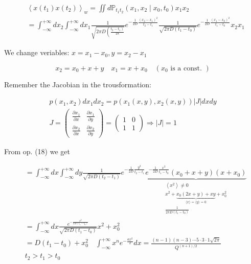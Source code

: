 \documentclass[10pt]{article}
\begin{document}
\begin{align*}
& \left\langle x\left(t_{1}\right) x\left(t_{2}\right)\right\rangle_{w}=\iint d \mathbb{P}_{t_{1} t_{2}}\left(x_{1}, x_{2} \mid x_{0}, t_{0}\right) x_{1} x_{2}  \tag{18}\\
& =\int_{-\infty}^{+\infty} d x_{2} \int_{-\infty}^{+\infty} d x_{1} \frac{1}{\sqrt{2 \pi D\left(\frac{\left.t_{2}-t_{1}\right)}{18}\right.}} e^{-\frac{1}{2 D} \frac{\left(x_{2}-x_{1}\right)^{2}}{t_{2}-t_{1}}} \frac{1}{\sqrt{2 \pi D\left(t_{1}-t_{0}\right)}} e^{-\frac{1}{2 D} \frac{\left(x_{1}-x_{0}\right)^{2}}{t_{1}-t_{0}}} x_{2} x_{1}
\end{align*}


We change veriables: $x=x_{1}-x_{0}, y=x_{2}-x_{1}$

$$
x_{2}=x_{0}+x+y \quad x_{1}=x+x_{0} \quad\left(x_{0} \text { is a const. }\right)
$$

Remember the Jacobian in the trousformation:

$$
\begin{array}{r}
p\left(x_{1}, x_{2}\right) d x_{1} d x_{2}=p\left(x_{1}(x, y), x_{2}(x, y)\right)|J| d x d y \\
J=\left(\begin{array}{cc}
\frac{\partial x_{1}}{\partial x} & \frac{\partial x_{1}}{\partial y} \\
\frac{\partial x_{2}}{\partial x} & \frac{\partial x_{2}}{\partial y}
\end{array}\right)=\left(\begin{array}{cc}
1 & 0 \\
1 & 1
\end{array}\right) \Rightarrow|J|=1
\end{array}
$$

From op. (18) we get

$$
\begin{aligned}
& =\int_{-\infty}^{+\infty} d x \int_{-\infty}^{+\infty} d y \frac{1}{\sqrt{2 \pi D\left(t_{2}-t_{1}\right)}} e^{-\frac{1}{2 D} \frac{y^{2}}{t_{2}-t_{1}}} \underbrace{e^{-\frac{1}{2 D} \frac{x^{2}}{t_{1}-t_{0}}}\left(x_{0}+x+y\right)\left(x+x_{0}\right)}_{\begin{array}{c}
\left\langle x^{2}\right\rangle \neq 0 \\
x^{2}+\underbrace{x_{0}(2 x+y)+x y}_{\langle x\rangle=\langle y\rangle=0}+x_{0}^{2} \\
\frac{1}{2 \pi D\left(t_{1}-t_{0}\right)}
\end{array}} \\
& =\int_{-\infty}^{+\infty} d x \frac{e^{-\frac{x^{2}}{2 \Delta\left(t_{1}-t_{0}\right)}}}{\sqrt{2 \pi D\left(t_{1}-t_{0}\right)}} x^{2}+x_{0}^{2} \\
& =D\left(t_{1}-t_{0}\right)+x_{0}^{2} \quad \int_{-\infty}^{+\infty} x^{n} e^{-\frac{a x^{2}}{2}} d x=\frac{(n-1)(n-3) \cdots 5 \cdot 3 \cdot 1 \sqrt{2 \pi}}{Q^{(n+1) / 2}} \\
& t_{2}>t_{1}>t_{0}
\end{aligned}
$$
\end{document}
